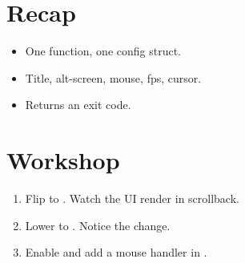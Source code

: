 \section{Recap}

\begin{recap}
\begin{itemize}[leftmargin=*]
  \item One function, one config struct.
  \item Title, alt-screen, mouse, fps, cursor.
  \item Returns an exit code.
\end{itemize}
\end{recap}

\section*{Workshop}

\begin{enumerate}[leftmargin=*]
  \item Flip  to . Watch the
    UI render in scrollback.
  \item Lower  to . Notice the change.
  \item Enable  and add a mouse handler in
    .
\end{enumerate}
